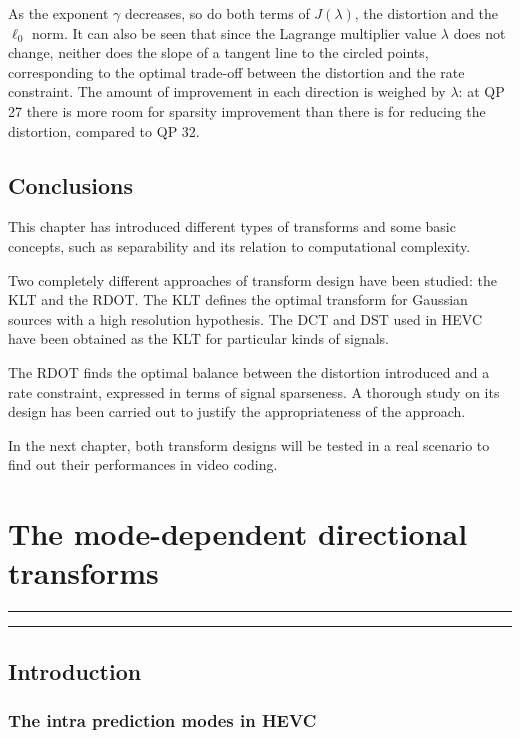 \documentclass[11pt,a4paper,openright,twoside]{book}
\providecommand{\chaptertoc}{
	\startcontents[chapters]
	\hrule
	\vspace{1em}
	\printcontents[chapters]{}{1}{{\bf\large Contents}}
	\hrule
}
\numberwithin{equation}{section} %
\numberwithin{figure}{section} %
\numberwithin{table}{section} %
\begin{document}
As the exponent $\gamma$ decreases, so do both terms of $J(\lambda)$,
the distortion and the $\ell_0$ norm.
It can also be seen that since the Lagrange multiplier value $\lambda$
does not change, neither does the slope of a tangent line to the circled
points, corresponding to the optimal trade-off between the distortion
and the rate constraint.
The amount of improvement in each direction is weighed by $\lambda$: at
\ac{QP} 27 there is more room for sparsity improvement than there is for
reducing the distortion, compared to \ac{QP} 32.

\section{Conclusions}
\label{sec:conclusions_transforms}

This chapter has introduced different types of transforms and some
basic concepts, such as separability and its relation to computational
complexity.

Two completely different approaches of transform design have been
studied: the \ac{KLT} and the \ac{RDOT}.
The \ac{KLT} defines the optimal transform for Gaussian sources with a
high resolution hypothesis.
The \ac{DCT} and \ac{DST} used in \ac{HEVC} have been obtained as the
\ac{KLT} for particular kinds of signals.

The \ac{RDOT} finds the optimal balance between the distortion
introduced and a rate constraint, expressed in terms of signal sparseness.
A thorough study on its design has been carried out to justify the
appropriateness of the approach.

In the next chapter, both transform designs will be tested in a real
scenario to find out their performances in video coding.


\chapter{The mode-dependent directional transforms}
\label{cha:the_mode_dependent_directional_transforms}
\chaptertoc

\section{Introduction}
\label{sec:introduction_mddt}

\subsection{The intra prediction modes in \acs{HEVC}}
\label{sub:the_intra_prediction_modes_in_hevc}
\end{document}
